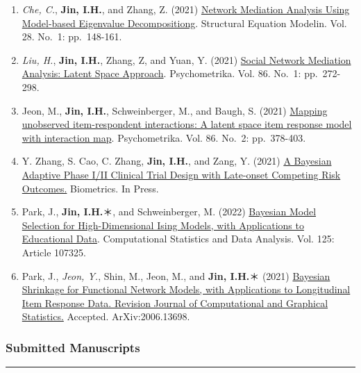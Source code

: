 \documentclass[
]{book}
\begin{document}
\begin{enumerate}
\item
  \emph{Che, C.}, \textbf{Jin, I.H.}, and Zhang, Z. (2021) \href{https://www.researchgate.net/publication/339371541_Network_Mediation_Analysis_Using_Model-Based_Eigenvalue_Decomposition}{Network Mediation Analysis Using Model-based Eigenvalue Decompositiong}. Structural Equation Modelin. Vol. 28. No.~1: pp.~148-161.
\item
  \emph{Liu, H.}, \textbf{Jin, I.H.}, Zhang, Z, and Yuan, Y. (2021) \href{https://arxiv.org/abs/1810.03751}{Social Network Mediation Analysis: Latent Space Approach}. Psychometrika. Vol. 86. No.~1: pp.~272-298.
\item
  Jeon, M., \textbf{Jin, I.H.}, Schweinberger, M., and Baugh, S. (2021) \href{https://arxiv.org/abs/2007.08719}{Mapping unobserved item-respondent interactions: A latent space item response model with interaction map}. Psychometrika. Vol. 86. No.~2: pp.~378-403.
\item
  Y. Zhang, S. Cao, C. Zhang, \textbf{Jin, I.H.}, and Zang, Y. (2021) \href{https://doi.org/10.1111/biom.13347}{A Bayesian Adaptive Phase I/II Clinical Trial Design with Late-onset Competing Risk Outcomes.} Biometrics. In Press.
\item
  Park, J., \textbf{Jin, I.H.}＊, and Schweinberger, M. (2022) \href{https://arxiv.org/abs/1911.07142}{Bayesian Model Selection for High-Dimensional Ising Models, with Applications to Educational Data}. Computational Statistics and Data Analysis. Vol. 125: Article 107325.
\item
  Park, J., \emph{Jeon, Y.}, Shin, M., Jeon, M., and \textbf{Jin, I.H.}＊ (2021) \href{https://arxiv.org/abs/2006.13698}{Bayesian Shrinkage for Functional Network Models, with Applications to Longitudinal Item Response Data. Revision Journal of Computational and Graphical Statistics.} Accepted. ArXiv:2006.13698.
\end{enumerate}

\hypertarget{submitted-manuscripts}{%
\subsubsection*{Submitted Manuscripts}\label{submitted-manuscripts}}

\begin{center}\rule{0.5\linewidth}{0.5pt}\end{center}
\end{document}
